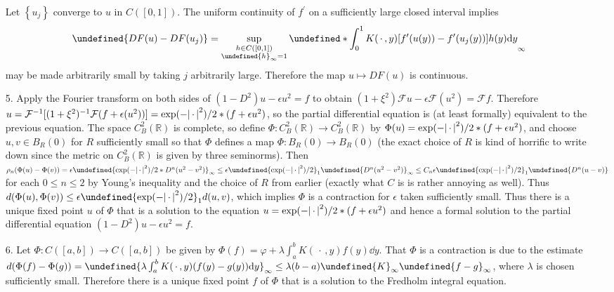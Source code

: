 \documentclass[11pt,leqno]{article}
\theoremstyle{plain}
\theoremstyle{definition}
\numberwithin{equation}{section}
\numberwithin{lem}{section}
\newcommand{\cbr}[1]{\left\{#1\right\}}
\let\norm\undefined %
\DeclarePairedDelimiter\norm{\lVert}{\rVert}
\begin{document}
\begin{enumerate}
    Let $\cbr{u_j}$ converge to $u$ in $C([0,1])$. The uniform continuity of $f^\prime$ on a sufficiently large closed interval implies
    \[\norm{DF(u)-DF(u_j)} = \sup_{\substack{h\in C([0,1])\\ \norm{h}_\infty = 1}}\norm*{\int_0^1K(\,\cdot\, ,y)[f^\prime(u(y))- f^\prime(u_j(y))]h(y)\dd y}_\infty\] may be made arbitrarily small by taking $j$ arbitrarily large. Therefore the map $u\mapsto DF(u)$ is continuous.
    \item[5.] Apply the Fourier transform on both sides of $(1-D^2)u - \epsilon u^2 = f$ to obtain $(1+\xi^2)\mathcal F u - \epsilon \mathcal F(u^2) = \mathcal F f$. Therefore $u = \mathcal F^{-1}[(1+\xi^2)^{-1}\mathcal F(f+\epsilon (u^2))] = \exp\relax(-\abs{\,\cdot\,}^2)/2\ast (f+\epsilon u^2)$, so the partial differential equation is (at least formally) equivalent to the previous equation. The space $C^2_B(\mathbb R)$ is complete, so define $\Phi\colon C^2_B(\mathbb R)\to C^2_B(\mathbb R)$ by $\Phi(u) = \exp\relax(-\abs{\,\cdot\,}^2)/2\ast (f+\epsilon u^2)$, and choose $u,v\in B_R(0)$ for $R$ sufficiently small so that $\Phi$ defines a map $\Phi\colon B_R(0)\to B_R(0)$ (the exact choice of $R$ is kind of horrific to write down since the metric on $C^2_B(\mathbb R)$ is given by three seminorms). Then $\rho_n(\Phi(u)-\Phi(v)) = \epsilon\norm{\exp\relax(-\abs{\,\cdot\,}^2)/2\ast D^n(u^2-v^2)}_\infty \leq \epsilon\norm{\exp\relax(-\abs{\,\cdot\,}^2)/2}_1\norm{D^n(u^2-v^2)}_\infty\leq C_n\epsilon\norm{\exp\relax(-\abs{\,\cdot\,}^2)/2}_1\norm{D^n(u-v)}$ for each $0\leq n\leq 2$ by Young's inequality and the choice of $R$ from earlier (exactly what $C$ is is rather annoying as well). Thus $d(\Phi(u),\Phi(v))\leq \epsilon\norm{\exp\relax(-\abs{\,\cdot\,}^2)/2}_1d(u,v)$, which implies $\Phi$ is a contraction for $\epsilon$ taken sufficiently small. Thus there is a unique fixed point $u$ of $\Phi$ that is a solution to the equation $u = \exp\relax(-\abs{\,\cdot\,}^2)/2\ast (f+\epsilon u^2)$ and hence a formal solution to the partial differential equation $(1-D^2)u - \epsilon u^2 = f$.
    \item[6.] Let $\Phi\colon C([a,b])\to C([a,b])$ be given by $\Phi(f) = \varphi + \lambda\int_a^b K(\,\cdot\,,y)f(y)\dd y$. That $\Phi$ is a contraction is due to the estimate $d(\Phi(f)-\Phi(g)) = \norm{\lambda\int_a^bK(\,\cdot\,,y)(f(y)-g(y))\dd y}_\infty\leq \lambda(b-a)\norm{K}_\infty\norm{f-g}_\infty$, where $\lambda$ is chosen sufficiently small. Therefore there is a unique fixed point $f$ of $\Phi$ that is a solution to the Fredholm integral equation.
\end{enumerate}
\end{document}
